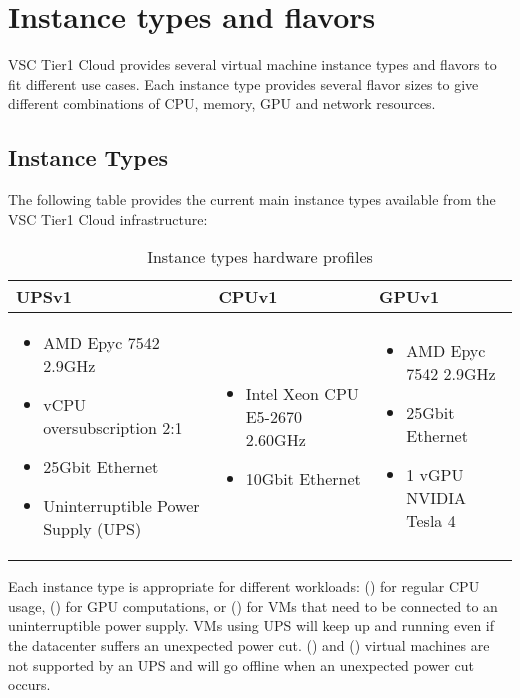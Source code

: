 \chapter{Instance types and flavors}

VSC Tier1 Cloud provides several virtual machine instance types
and flavors to fit different use cases.
Each instance type provides several flavor sizes to give different
combinations of CPU, memory, GPU and network resources.

\section{Instance Types}\label{sec:instance-types}
The following table provides the current main instance types available
from the VSC Tier1 Cloud infrastructure:

\begin{table}[h!]
\centering
\begin{tabular}{ |p{6cm}|p{4cm}|p{5cm}| }
  \hline
  \rowcolor{lightgray} \textbf{UPSv1} & \textbf{CPUv1} & \textbf{GPUv1} \\
  \hline
  \begin{itemize}
    \item AMD Epyc 7542 2.9GHz
    \item vCPU oversubscription 2:1
    \item 25Gbit Ethernet
    \item Uninterruptible Power Supply (UPS)
  \end{itemize}
  &
  \begin{itemize}
    \item Intel Xeon CPU E5-2670 2.60GHz
    \item 10Gbit Ethernet
  \end{itemize}
  &
  \begin{itemize}
    \item AMD Epyc 7542 2.9GHz
    \item 25Gbit Ethernet
    \item 1 vGPU NVIDIA Tesla 4
  \end{itemize}
  \\
  \hline
\end{tabular}
\caption{Instance types hardware profiles}
\label{table:instance-type}
\end{table}

Each instance type is appropriate for different workloads:
() for regular CPU usage,
() for GPU computations,
or () for VMs that need to be connected to an uninterruptible power supply.
VMs using UPS will keep up and running even if the datacenter suffers
an unexpected power cut.
() and () virtual machines are not supported by an UPS and will go offline when an unexpected power cut occurs.


